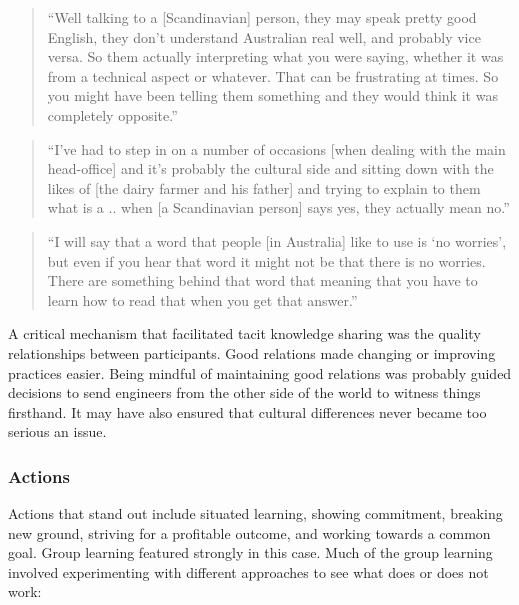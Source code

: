 \begin{quote}
\small
\enquote{Well talking to a [Scandinavian] person, they may speak pretty good English, they don't understand Australian real well, and probably vice versa. So them actually interpreting what you were saying, whether it was from a technical aspect or whatever. That can be frustrating at times. So you might have been telling them something and they would think it was completely opposite.} \\
\end{quote}

\begin{quote}
\small
\enquote{I've had to step in on a number of occasions [when dealing with the main head-office] and it's probably the cultural side and sitting down with the likes of [the dairy farmer and his father] and trying to explain to them what is a .. when [a Scandinavian person] says yes, they actually mean no.} \\
\end{quote}

\begin{quote}
\small
\enquote{I will say that a word that people [in Australia] like to use is \enquote{no worries}, but even if you hear that word it might not be that there is no worries. There are something behind that word that meaning that you have to learn how to read that when you get that answer.} \\
\end{quote}

A critical mechanism that facilitated tacit knowledge sharing was the quality relationships between participants. Good relations made changing or improving practices easier. Being mindful of maintaining good relations was probably guided decisions to send engineers from the other side of the world to witness things firsthand. It may have also ensured that cultural differences never became too serious an issue. 

\subsubsection{Actions}

Actions that stand out include situated learning, showing commitment, breaking new ground, striving for a profitable outcome, and working towards a common goal. Group learning featured strongly in this case. Much of the group learning involved experimenting with different approaches to see what does or does not work:


